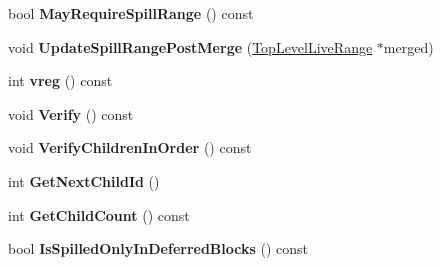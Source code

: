 \begin{DoxyCompactItemize}
\item 
bool {\bfseries May\+Require\+Spill\+Range} () const \hypertarget{classv8_1_1internal_1_1compiler_1_1_top_level_live_range_a2d9b17f98ee93c7fc1dae700101fa490}{}\label{classv8_1_1internal_1_1compiler_1_1_top_level_live_range_a2d9b17f98ee93c7fc1dae700101fa490}

\item 
void {\bfseries Update\+Spill\+Range\+Post\+Merge} (\hyperlink{classv8_1_1internal_1_1compiler_1_1_top_level_live_range}{Top\+Level\+Live\+Range} $\ast$merged)\hypertarget{classv8_1_1internal_1_1compiler_1_1_top_level_live_range_a374133d33ed5a335bcfc2d7b5f863cf1}{}\label{classv8_1_1internal_1_1compiler_1_1_top_level_live_range_a374133d33ed5a335bcfc2d7b5f863cf1}

\item 
int {\bfseries vreg} () const \hypertarget{classv8_1_1internal_1_1compiler_1_1_top_level_live_range_a83a6659d714d6f7f6879e7ac22f2ae06}{}\label{classv8_1_1internal_1_1compiler_1_1_top_level_live_range_a83a6659d714d6f7f6879e7ac22f2ae06}

\item 
void {\bfseries Verify} () const \hypertarget{classv8_1_1internal_1_1compiler_1_1_top_level_live_range_a0fb517f5fb8ad9b32f40d5bce9dfcc49}{}\label{classv8_1_1internal_1_1compiler_1_1_top_level_live_range_a0fb517f5fb8ad9b32f40d5bce9dfcc49}

\item 
void {\bfseries Verify\+Children\+In\+Order} () const \hypertarget{classv8_1_1internal_1_1compiler_1_1_top_level_live_range_a8ee612bfab1565ec6c5511886572d893}{}\label{classv8_1_1internal_1_1compiler_1_1_top_level_live_range_a8ee612bfab1565ec6c5511886572d893}

\item 
int {\bfseries Get\+Next\+Child\+Id} ()\hypertarget{classv8_1_1internal_1_1compiler_1_1_top_level_live_range_a5bc9f21f14158644c72a6f32ac2966f9}{}\label{classv8_1_1internal_1_1compiler_1_1_top_level_live_range_a5bc9f21f14158644c72a6f32ac2966f9}

\item 
int {\bfseries Get\+Child\+Count} () const \hypertarget{classv8_1_1internal_1_1compiler_1_1_top_level_live_range_a09eb03c7a7c274f1f6b3d7f0cb8b15b9}{}\label{classv8_1_1internal_1_1compiler_1_1_top_level_live_range_a09eb03c7a7c274f1f6b3d7f0cb8b15b9}

\item 
bool {\bfseries Is\+Spilled\+Only\+In\+Deferred\+Blocks} () const \hypertarget{classv8_1_1internal_1_1compiler_1_1_top_level_live_range_a77295fbc22588e8d308dd90d21718d4f}{}\label{classv8_1_1internal_1_1compiler_1_1_top_level_live_range_a77295fbc22588e8d308dd90d21718d4f}


\end{DoxyCompactItemize}
